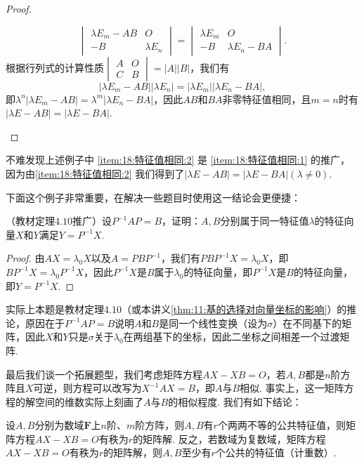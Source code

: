 \begin{proof}
\begin{enumerate}
\[\begin{vmatrix}
                      \lambda E_m-AB & O \\ -B & \lambda E_n
                  \end{vmatrix}=\begin{vmatrix}
                      \lambda E_m & O \\ -B & \lambda E_n-BA
                  \end{vmatrix}.\]
              根据行列式的计算性质$\begin{vmatrix}
                      A & O \\ C & B
                  \end{vmatrix}=|A||B|$，我们有
              \[|\lambda E_m-AB||\lambda E_n|=|\lambda E_m||\lambda E_n-BA|,\]
              即$\lambda^n|\lambda E_m-AB|=\lambda^m|\lambda E_n-BA|$，因此$AB$和$BA$非零特征值相同，且$m=n$时有$|\lambda E-AB|=|\lambda E-BA|$.
    \end{enumerate}
\end{proof}

不难发现上述例子中 \ref*{item:18:特征值相同:2} 是 \ref*{item:18:特征值相同:1} 的推广，因为由\ref*{item:18:特征值相同:2} 我们得到了$|\lambda E-AB|=|\lambda E-BA|(\lambda\neq 0)$.

下面这个例子非常重要，在解决一些题目时使用这一结论会更便捷：
\begin{example}
    （教材定理$4.10$推广）设$P^{-1}AP=B$，证明：$A,B$分别属于同一特征值$\lambda$的特征向量$X$和$Y$满足$Y=P^{-1}X$.
\end{example}

\begin{proof}
    由$AX=\lambda_0 X$以及$A=PBP^{-1}$，我们有$PBP^{-1}X=\lambda_0 X$，即$BP^{-1}X=\lambda_0 P^{-1}X$，因此$P^{-1}X$是$B$属于$\lambda_0$的特征向量，即$P^{-1}X$是$B$的特征向量，即$Y=P^{-1}X$.
\end{proof}

实际上本题是教材定理4.10（或本讲义\autoref{thm:11:基的选择对向量坐标的影响}）的推论，原因在于$P^{-1}AP=B$说明$A$和$B$是同一个线性变换（设为$\sigma$）在不同基下的矩阵，因此$X$和$Y$只是$\sigma$关于$\lambda_0$在两组基下的坐标，因此二坐标之间相差一个过渡矩阵.

最后我们谈一个拓展题型，我们考虑矩阵方程$AX-XB=O$，若$A,B$都是$n$阶方阵且$X$可逆，则方程可以改写为$X^{-1}AX=B$，即$A$与$B$相似. 事实上，这一矩阵方程的解空间的维数实际上刻画了$A$与$B$的相似程度. 我们有如下结论：
\begin{theorem}
    设$A,B$分别为数域$\mathbf{F}$上$n$阶、$m$阶方阵，则$A,B$有$r$个两两不等的公共特征值，则矩阵方程$AX-XB=O$有秩为$r$的矩阵解. 反之，若数域为复数域，矩阵方程$AX-XB=O$有秩为$r$的矩阵解，则$A,B$至少有$r$个公共的特征值（计重数）.
\end{theorem}

